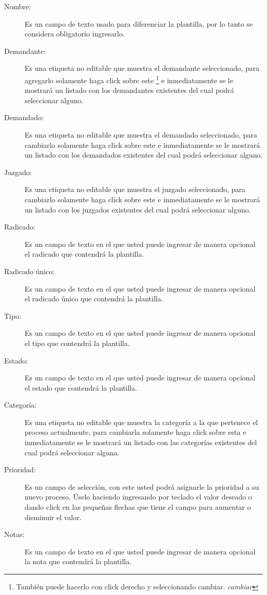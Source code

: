 \begin{description}
\item[Nombre:]Es un campo de texto usado para diferenciar la plantilla, por lo
tanto se considera obligatorio ingresarlo.
\item[Demandante:]Es una etiqueta no editable que muestra el demandante
seleccionado, para agregarlo solamente haga click sobre este
\footnote{Tambi\'en puede hacerlo con click derecho y seleccionando cambiar. \emph{cambiar}}
e inmediatamente se
le mostrar\'a un listado con los demandantes existentes del cual podr\'a
seleccionar alguno.
\item[Demandado:]Es una etiqueta no editable que muestra el demandado
seleccionado, para cambiarlo solamente haga click sobre este
\footnotemark[\value{footnote}]
e inmediatamente
se le mostrar\'a un listado con los demandados existentes del cual podr\'a
seleccionar alguno.
\item[Juzgado:]Es una etiqueta no editable que muestra el juzgado
seleccionado, para cambiarlo solamente haga click sobre este
\footnotemark[\value{footnote}]
e inmediatamente
se le mostrar\'a un listado con los juzgados existentes del cual podr\'a
seleccionar alguno.
\item[Radicado:]Es un campo de texto en el que usted puede ingresar de manera
opcional el radicado que contendr\'a la plantilla.
\item[Radicado \'unico:]Es un campo de texto en el que usted puede ingresar de
manera opcional el radicado \'unico que contendr\'a la plantilla.
\item[Tipo:]Es un campo de texto en el que usted puede ingresar de manera
opcional el tipo que contendr\'a la plantilla.
\item[Estado:]Es un campo de texto en el que usted puede ingresar de manera
opcional el estado que contendr\'a la plantilla.
\item[Categor\'ia:]Es una etiqueta no editable que muestra la categor\'ia
a la que pertenece el proceso actualmente, para cambiarla solamente haga click
sobre esta
\footnotemark[\value{footnote}]
e inmediatamente
se le mostrar\'a un listado con las categor\'ias existentes del cual podr\'a
seleccionar alguna.
\item[Prioridad:]Es un campo de selecci\'on, con este usted podr\'a asignarle
la prioridad a su nuevo proceso. \'Uselo haciendo ingresando por teclado el valor deseado o dando click en las peque\~nas flechas que tiene el campo para aumentar o disminuir el valor.
\item[Notas:]Es un campo de texto en el que usted puede ingresar de manera
opcional la nota que contendr\'a la plantilla.
\end{description}

